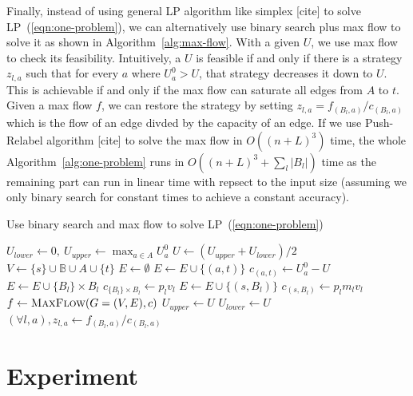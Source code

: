 \documentclass{article}
\begin{document}
Finally, instead of using general LP algorithm like simplex [cite] to solve
LP~(\ref{eqn:one-problem}), we can alternatively use binary search plus max
flow to solve it as shown in Algorithm~\ref{alg:max-flow}.  With a given $U$,
we use max flow to check its feasibility. Intuitively, a $U$ is feasible if and
only if there is a strategy $z_{l, a}$ such that for every $a$ where $U^0_a >
U$, that strategy decreases it down to $U$. This is achievable if and only if
the max flow can saturate all edges from $A$ to $t$. Given a max flow $f$, we
can restore the strategy by setting $z_{l, a} = f_{(B_l, a)}/c_{(B_l, a)}$
which is the flow of an edge divded by the capacity of an edge. If we use
Push-Relabel algorithm [cite] to solve the max flow in $O((n+L)^3)$ time, the
whole Algorithm~\ref{alg:one-problem} runs in $O((n+L)^3 + \sum_l |B_l|)$ time
as the remaining part can run in linear time with repsect to the input size
(assuming we only binary search for constant times to achieve a constant
accuracy).

\begin{algorithm}
\caption{Use binary search and max flow to solve LP~(\ref{eqn:one-problem})}
\label{alg:max-flow}
\begin{algorithmic}[1]
	\State $U_{lower} \gets 0, ~U_{upper} \gets \max_{a \in A} U^0_a$
		\State $U \gets (U_{upper}+U_{lower})/2$ 
		\State $V \gets \{s\} \cup \mathbb B \cup A \cup \{t\}$ 
		\State $E \gets \emptyset$ 
				\State $E \gets E \cup \{(a, t)\}$
				\State $c_{(a, t)} \gets U^0_a-U$ 
			\EndIf
		\EndFor
			\State $E \gets E \cup \{B_l\} \times B_l$ %
			\State $c_{\{B_l\} \times B_l} \gets p_l v_l$ 
			\State $E \gets E \cup \{(s, B_l)\}$ %
			\State $c_{(s, B_l)} \gets p_l m_l v_l$
		\EndFor
		\State $f \gets \Call{MaxFlow}{G = (V, E), c}$
			\State $U_{upper} \gets U$
		\Else
			\State $U_{lower} \gets U$
		\EndIf
	\EndWhile
	\State $(\forall l, a), z_{l,a} \gets f_{(B_l,a)} / c_{(B_l, a)}$
	\State {}
\end{algorithmic}
\end{algorithm}

\section{Experiment}
\end{document}
